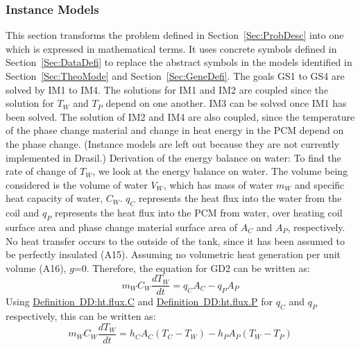 \documentclass[12pt]{article}
\begin{document}
\subsubsection{Instance Models}
\label{Sec:InstMode}
This section transforms the problem defined in Section~\ref{Sec:ProbDesc} into one which is expressed in mathematical terms. It uses concrete symbols defined in Section~\ref{Sec:DataDefi} to replace the abstract symbols in the models identified in Section~\ref{Sec:TheoMode} and Section~\ref{Sec:GeneDefi}.
The goals GS1 to GS4 are solved by IM1 to IM4. The solutions for IM1 and IM2 are coupled since the solution for $T_{W}$ and $T_{P}$ depend on one another. IM3 can be solved once IM1 has been solved. The solution of IM2 and IM4 are also coupled, since the temperature of the phase change material and change in heat energy in the PCM depend on the phase change. (Instance models are left out because they are not currently implemented in Drasil.)
Derivation of the energy balance on water:
To find the rate of change of $T_{W}$, we look at the energy balance on water. The volume being considered is the volume of water $V_{W}$, which has mass of water $m_{W}$ and specific heat capacity of water, $C_{W}$. $q_{C}$ represents the heat flux into the water from the coil and $q_{P}$ represents the heat flux into the PCM from water, over heating coil surface area and phase change material surface area of $A_{C}$ and $A_{P}$, respectively. No heat transfer occurs to the outside of the tank, since it has been assumed to be perfectly insulated (A15). Assuming no volumetric heat generation per unit volume (A16), $g$=0. Therefore, the equation for GD2 can be written as:
\begin{equation}
m_{W}C_{W}\frac{dT_{W}}{dt}=q_{C}A_{C}-q_{P}A_{P}
\end{equation}
Using \hyperref[DD:ht.flux.C]{Definition~DD:ht.flux.C} and \hyperref[DD:ht.flux.P]{Definition~DD:ht.flux.P} for $q_{C}$ and $q_{P}$ respectively, this can be written as:
\begin{equation}
m_{W}C_{W}\frac{dT_{W}}{dt}=h_{C}A_{C}(T_{C}-T_{W})-h_{P}A_{P}(T_{W}-T_{P})
\end{equation}
\end{document}
